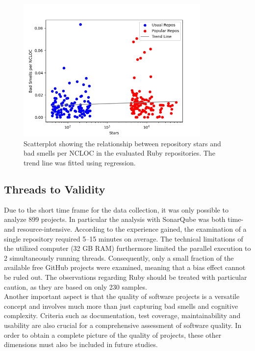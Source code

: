 \documentclass[a4paper, 12pt]{article}
\begin{document}
\begin{figure}[h!]
  \centering
  \includegraphics[width=0.85\textwidth]{../media/ruby-smells-scatterplot.png}
  \caption{Scatterplot showing the relationship between repository stars and bad smells per NCLOC in the evaluated Ruby repositories. The trend line was fitted using regression.}
  \label{fig:scatter-smells-ruby}
\end{figure}

\subsection*{Threads to Validity}

Due to the short time frame for the data collection, it was only possible to analyze 899 projects. In particular the analysis with SonarQube was both time- and resource-intensive. According to the experience gained, the examination of a single repository required 5--15 minutes on average. The technical limitations of the utilized computer (32 GB RAM) furthermore limited the parallel execution to 2 simultaneously running threads.  Consequently, only a small fraction of the available free GitHub projects were examined, meaning that a bias effect cannot be ruled out. The observations regarding Ruby should be treated with particular caution, as they are based on only 230 samples.\\

Another important aspect is that the quality of software projects is a versatile concept and involves much more than just capturing bad smells and cognitive complexity. Criteria such as documentation, test coverage, maintainability and usability are also crucial for a comprehensive assessment of software quality. In order to obtain a complete picture of the quality of projects, these other dimensions must also be included in future studies.\\
\end{document}
